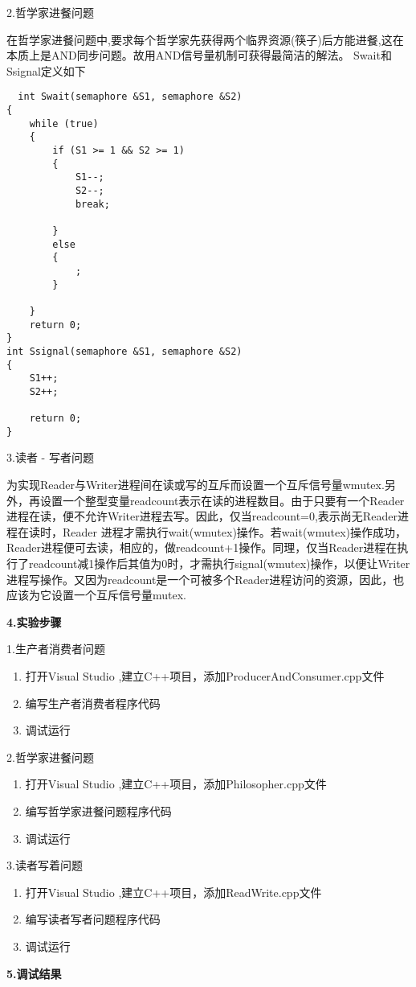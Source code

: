 \documentclass[UTF8,a4paper]{ctexart}
\begin{document}
2.哲学家进餐问题

在哲学家进餐问题中,要求每个哲学家先获得两个临界资源(筷子)后方能进餐,这在本质上是AND同步问题。故用AND信号量机制可获得最简洁的解法。
Swait和Ssignal定义如下
\begin{lstlisting}
  int Swait(semaphore &S1, semaphore &S2)
{
	while (true)
	{
		if (S1 >= 1 && S2 >= 1)
		{
			S1--;
			S2--;
			break;

		}
		else
		{
			;
		}

	}
	return 0;
}
int Ssignal(semaphore &S1, semaphore &S2)
{
	S1++;
	S2++;

	return 0;
}
\end{lstlisting}

3.读者 - 写者问题

为实现Reader与Writer进程间在读或写的互斥而设置一个互斥信号量wmutex.另外，再设置一个整型变量readcount表示在读的进程数目。由于只要有一个Reader进程在读，便不允许Writer进程去写。因此，仅当readcount=0,表示尚无Reader进程在读时，Reader 进程才需执行wait(wmutex)操作。若wait(wmutex)操作成功，Reader进程便可去读，相应的，做readcount+1操作。同理，仅当Reader进程在执行了readcount减1操作后其值为0时，才需执行signal(wmutex)操作，以便让Writer进程写操作。又因为readcount是一个可被多个Reader进程访问的资源，因此，也应该为它设置一个互斥信号量mutex.

  {\noindent{}\bfseries{4.实验步骤}}
  
\noindent 1.生产者消费者问题
\begin{enumerate}[label=(\arabic*)]
\item 打开Visual Studio ,建立C++项目，添加ProducerAndConsumer.cpp文件
\item 编写生产者消费者程序代码
\item 调试运行
\end{enumerate}
\noindent 2.哲学家进餐问题
\begin{enumerate}[label=(\arabic*)]
\item 打开Visual Studio ,建立C++项目，添加Philosopher.cpp文件
\item 编写哲学家进餐问题程序代码
\item 调试运行
\end{enumerate}
\noindent 3.读者写着问题
\begin{enumerate}[label=(\arabic*)]
\item 打开Visual Studio ,建立C++项目，添加ReadWrite.cpp文件
\item 编写读者写者问题程序代码
\item 调试运行
\end{enumerate}
    {\noindent{}\bfseries{5.调试结果}}
\end{document}
